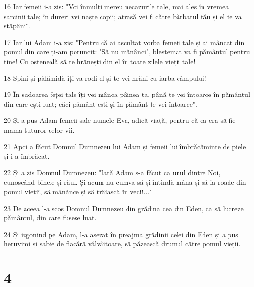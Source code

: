 \par 16 Iar femeii i-a zis: "Voi înmulți mereu necazurile tale, mai ales în vremea sarcinii tale; în dureri vei naște copii; atrasă vei fi către bărbatul tău și el te va stăpâni".
\par 17 Iar lui Adam i-a zis: "Pentru că ai ascultat vorba femeii tale și ai mâncat din pomul din care ți-am poruncit: "Să nu mănânci", blestemat va fi pământul pentru tine! Cu osteneală să te hrănești din el în toate zilele vieții tale!
\par 18 Spini și pălămidă îți va rodi el și te vei hrăni cu iarba câmpului!
\par 19 În sudoarea feței tale îți vei mânca pâinea ta, până te vei întoarce în pământul din care ești luat; căci pământ ești și în pământ te vei întoarce".
\par 20 Și a pus Adam femeii sale numele Eva, adică viață, pentru că ea era să fie mama tuturor celor vii.
\par 21 Apoi a făcut Domnul Dumnezeu lui Adam și femeii lui îmbrăcăminte de piele și i-a îmbrăcat.
\par 22 Și a zis Domnul Dumnezeu: "Iată Adam s-a făcut ca unul dintre Noi, cunoscând binele și răul. Și acum nu cumva să-și întindă mâna și să ia roade din pomul vieții, să mănânce și să trăiască în veci!..."
\par 23 De aceea l-a scos Domnul Dumnezeu din grădina cea din Eden, ca să lucreze pământul, din care fusese luat.
\par 24 Și izgonind pe Adam, l-a așezat în preajma grădinii celei din Eden și a pus heruvimi și sabie de flacără vâlvâitoare, să păzească drumul către pomul vieții.

\chapter{4}

